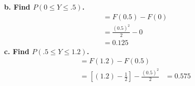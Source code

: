 \documentclass[
	a4paper, %
	10pt, %
	unnumberedsections, %
	twoside, %
]{LTJournalArticle}
\begin{document}
\\ \\
\textbf{b. Find $P(0 \le Y \le .5)$.} \\
\begin{equation*}
    \begin{aligned}
       &= F(0.5) - F(0) \\
       &= \frac{(0.5)^2}{2} - 0 \\
       &= 0.125
    \end{aligned}
\end{equation*}
\textbf{c. Find $P(.5 \le Y \le 1.2)$.}
\begin{equation*}
    \begin{aligned}
       &= F(1.2) - F(0.5) \\
       &= \left[ (1.2) - \frac{1}{2} \right] - \frac{(0.5)^2}{2}
       &= 0.575
    \end{aligned}
\end{equation*}
\vspace*{1pt}\noindent
\end{document}

